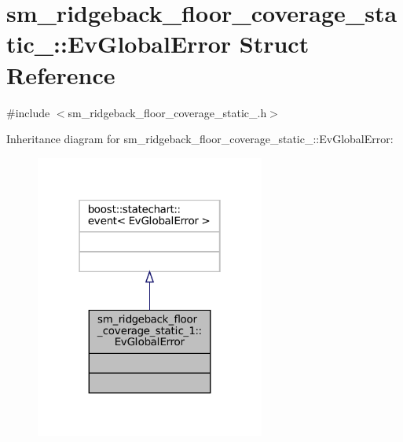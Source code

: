 \hypertarget{structsm__ridgeback__floor__coverage__static__1_1_1EvGlobalError}{}\section{sm\+\_\+ridgeback\+\_\+floor\+\_\+coverage\+\_\+static\+\_\+:\+:Ev\+Global\+Error Struct Reference}
\label{structsm__ridgeback__floor__coverage__static__1_1_1EvGlobalError}


{\ttfamily \#include $<$sm\+\_\+ridgeback\+\_\+floor\+\_\+coverage\+\_\+static\+\_.\+h$>$}



Inheritance diagram for sm\+\_\+ridgeback\+\_\+floor\+\_\+coverage\+\_\+static\+\_\+:\+:Ev\+Global\+Error\+:
\nopagebreak
\begin{figure}[H]
\begin{center}
\leavevmode
\includegraphics[width=214pt]{structsm__ridgeback__floor__coverage__static__1_1_1EvGlobalError__inherit__graph}
\end{center}
\end{figure}


